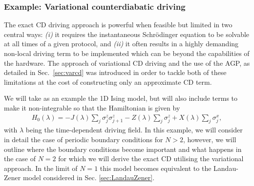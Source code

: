 \subsubsection{Example: Variational counterdiabatic driving}
\label{subsec:varl_AGP}

The exact CD driving approach is powerful when feasible but limited in two central ways: {\it (i)} it requires the instantaneous Schr\"odinger equation to be solvable at all times of a given protocol, and {\it (ii)} it often results in a highly demanding non-local driving term to be implemented which can be beyond the capabilities of the hardware. The approach of variational CD driving and the use of the AGP, as detailed in Sec.~\ref{sec:varcd} was introduced in order to tackle both of these limitations at the cost of constructing only an approximate CD term.

We will take as an example the 1D Ising model, but will also include terms to make it non-integrable so that the Hamiltonian is given by
\begin{eqnarray}\label{eq:IsingNonIntegrable}
    H_0(\lambda) = -J(\lambda) \sum_j \sigma^z_j \sigma^z_{j+1} - Z(\lambda) \sum_j \sigma^z_j + X(\lambda) \sum_j \sigma^x_j,
\end{eqnarray}
with $\lambda$ being the time-dependent driving field. In this example, we will consider in detail the case of periodic boundary conditions for $N > 2$, however, we will outline where the boundary conditions become important and what happens in the case of $N=2$ for which we will derive the exact CD utilising the variational approach. In the limit of $N=1$ this model becomes equivalent to the Landau-Zener model considered in Sec. \ref{sec:LandauZener}.

